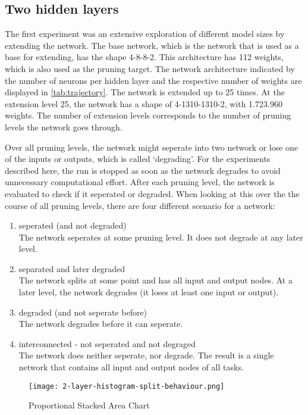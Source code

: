 \subsection{Two hidden layers} \label{two-hidden}
The first experiment was an extensive exploration of different model sizes by extending the network.
The base network, which is the network that is used as a base for extending, has the shape 4-8-8-2.
This architecture has 112 weights, which is also used as the pruning target.
The network architecture indicated by the number of neurons per hidden layer and the respective number of weights are displayed in \ref{tab:trajectory}.
The network is extended up to 25 times.
At the extension level 25, the network has a shape of 4-1310-1310-2, with 1.723.960 weights.
The number of extension levels corresponds to the number of pruning levels the network goes through.

Over all pruning levels, the network might seperate into two network or lose one of the inputs or outputs, which is called `degrading'.
For the experiments described here, the run is stopped as soon as the network degrades to avoid unnecessary computational effort.
After each pruning level, the network is evaluated to check if it seperated or degraded.
When looking at this over the the course of all pruning levels, there are four different scenario for a network:

\begin{enumerate}
    \item seperated (and not degraded)\\
    The network seperates at some pruning level. 
    It does not degrade at any later level. 
    \item separated and later degraded \\
    The network splits at some point and has all input and output nodes.
    At a later level, the network degrades (it loses at least one input or output).
    \item degraded (and not seperate before) \\
    The network degrades before it can seperate.
    \item interconnected - not seperated and not degraged \\
    The network does neither seperate, nor degrade. 
    The result is a single network that contains all input and output nodes of all tasks.
\end{enumerate}

\begin{figure}[ht]
    \centering
    \texttt{[image: 2-layer-histogram-split-behaviour.png]}
    \caption{Proportional Stacked Area Chart}
    \label{fig:2laxer-histogram}
\end{figure}

